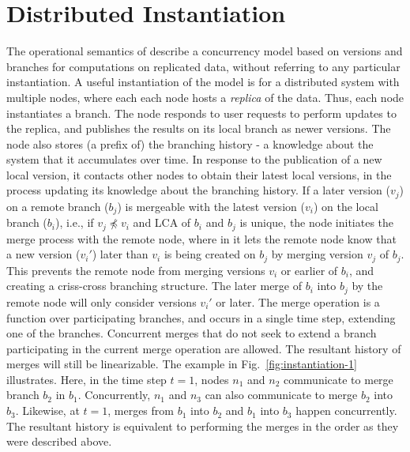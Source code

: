 \section{Distributed Instantiation}
\label{sec:system-model}



The operational semantics of \name describe a concurrency model based
on versions and branches for computations on replicated data, without
referring to any particular instantiation. A useful instantiation of
the model is for a distributed system with multiple nodes, where each
each node hosts a \emph{replica} of the data. Thus, each node
instantiates a branch. The node responds to user requests to perform
updates to the replica, and publishes the results on its local branch
as newer versions. The node also stores (a prefix of) the branching
history - a knowledge about the system that it accumulates over time.
In response to the publication of a new local version, it contacts
other nodes to obtain their latest local versions, in the process
updating its knowledge about the branching history. If a later version
($v_j$) on a remote branch ($b_j$) is mergeable with the latest
version ($v_i$) on the local branch ($b_i$), i.e., if $v_j \not\preceq
v_i$ and LCA of $b_i$ and $b_j$ is unique, the node initiates the
merge process with the remote node, where in it lets the remote node
know that a new version ($v_i'$) later than $v_i$ is being created on
$b_j$ by merging version $v_j$ of $b_j$. This prevents the remote node
from merging versions $v_i$ or earlier of $b_i$, and creating a
criss-cross branching structure. The later merge of $b_i$ into $b_j$
by the remote node will only consider versions $v_i'$ or later. The
merge operation is a function over participating branches, and occurs
in a single time step, extending one of the branches. Concurrent
merges that do not seek to extend a branch participating in the
current merge operation are allowed. The resultant history of merges
will still be linearizable. The example in
Fig.~\ref{fig:instantiation-1} illustrates. Here, in the time step
$t=1$, nodes $n_1$ and $n_2$ communicate to merge branch $b_2$ in
$b_1$. Concurrently, $n_1$ and $n_3$ can also communicate to merge
$b_2$ into $b_3$. Likewise, at $t=1$, merges from $b_1$ into $b_2$ and
$b_1$ into $b_3$ happen concurrently. The resultant history is
equivalent to performing the merges in the order as they were
described above.


